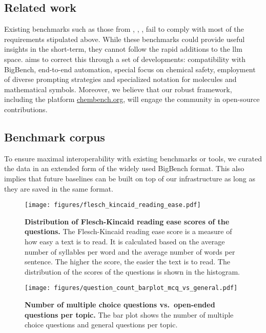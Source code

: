 \subsection{Related work}
Existing benchmarks such as those from \textcite{guo2023large}, \autocite{sun2023scieval}, \textcite{Schulze_Balhorn_2024}, \textcite{Cai_2024} fail to comply with most of the requirements stipulated above. 
While these benchmarks could provide useful insights in the short-term, they cannot follow the rapid additions to the \gls{llm} space. 
\chembench aims to correct this through a set of developments: compatibility with BigBench, end-to-end automation, special focus on chemical safety, employment of diverse prompting strategies and specialized notation for molecules and mathematical symbols. 
Moreover, we believe that our robust framework, including the platform \url{chembench.org}, will engage the community in open-source contributions.


\subsection{Benchmark corpus}
To ensure maximal interoperability with existing benchmarks or tools, we curated the data in an extended form of the widely used BigBench format.\autocite{srivastava2022beyond}
This also implies that future baselines can be built on top of our infrastructure as long as they are saved in the same format.

\begin{figure}[htb]
    \centering
    \texttt{[image: figures/flesch\_kincaid\_reading\_ease.pdf]}
    \caption{\textbf{Distribution of Flesch-Kincaid reading ease scores of the questions.} The Flesch-Kincaid reading ease score\autocite{flesch1948new} is a measure of how easy a text is to read. It is calculated based on the average number of syllables per word and the average number of words per sentence. The higher the score, the easier the text is to read. The distribution of the scores of the questions is shown in the histogram. }
    \label{fig:flesch_kincaid_reading_ease}
\end{figure}

\begin{figure}[htb]
    \centering
    \texttt{[image: figures/question\_count\_barplot\_mcq\_vs\_general.pdf]}
    \caption{\textbf{Number of multiple choice questions vs.\ open-ended questions per topic.} The bar plot shows the number of multiple choice questions and general questions per topic.}
    \label{fig:question_count_barplot_mcq_vs_general}
\end{figure}

